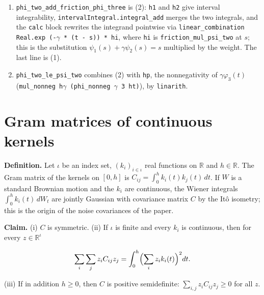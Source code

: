 \documentclass[11pt,a4paper]{article}
\begin{document}
\begin{leanbox}
\begin{enumerate}
\item \texttt{phi\_\allowbreak{}two\_\allowbreak{}add\_\allowbreak{}friction\_\allowbreak{}phi\_\allowbreak{}three} is (2): \texttt{h1} and \texttt{h2} give interval integrability, \texttt{interval\allowbreak{}Integral.\allowbreak{}integral\_\allowbreak{}add} merges the two integrals, and the \texttt{calc} block rewrites the integrand pointwise via \texttt{linear\_\allowbreak{}combination Real.\allowbreak{}exp (-\allowbreak{}\ensuremath{\gamma} * (t -\allowbreak{} s)) * hi}, where \texttt{hi} is \texttt{friction\_\allowbreak{}mul\_\allowbreak{}psi\_\allowbreak{}two} at \(s\); this is the substitution \(\psi_1(s)+\gamma\psi_2(s)=s\) multiplied by the weight. The last line is (1).

\item \texttt{phi\_\allowbreak{}two\_\allowbreak{}le\_\allowbreak{}psi\_\allowbreak{}two} combines (2) with \texttt{hp}, the nonnegativity of \(\gamma\varphi_3(t)\) (\texttt{mul\_\allowbreak{}nonneg h\ensuremath{\gamma} (phi\_\allowbreak{}nonneg \ensuremath{\gamma} 3 ht)}), by \texttt{linarith}.

\end{enumerate}
\end{leanbox}

\section{\texorpdfstring{Gram matrices of continuous kernels}{Gram matrices of continuous kernels}}


\textbf{Definition.} Let \(\iota\) be an index set, \((k_i)_{i\in\iota}\) real functions on \(\mathbb R\) and \(h\in\mathbb R\). The Gram matrix of the kernels on \([0,h]\) is \(C_{ij}=\int_0^hk_i(t)k_j(t)\,dt\). If \(W\) is a standard Brownian motion and the \(k_i\) are continuous, the Wiener integrals \(\int_0^hk_i(t)\,dW_t\) are jointly Gaussian with covariance matrix \(C\) by the Itô isometry; this is the origin of the noise covariances of the paper.




\textbf{Claim.} (i) \(C\) is symmetric. (ii) If \(\iota\) is finite and every \(k_i\) is continuous, then for every \(z\in\mathbb R^\iota\)


\[\sum_{i}\sum_{j}z_iC_{ij}z_j=\int_0^h\Bigl(\sum_iz_ik_i(t)\Bigr)^2dt .\]


(iii) If in addition \(h\ge0\), then \(C\) is positive semidefinite: \(\sum_{i,j}z_iC_{ij}z_j\ge0\) for all \(z\).
\end{document}

